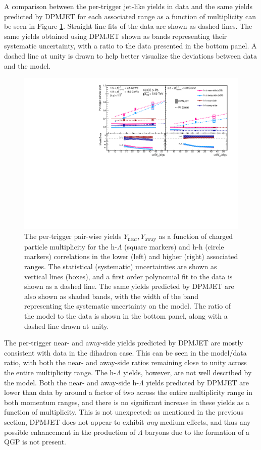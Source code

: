 A comparison between the per-trigger jet-like yields in data and the same yields predicted by DPMJET for each associated \pt range as a function of multiplicity can be seen in Figure \ref{fig:pairwise_yield_model}. Straight line fits of the data are shown as dashed lines. The same yields obtained using DPMJET shown as bands representing their systematic uncertainty, with a ratio to the data presented in the bottom panel. A dashed line at unity is drawn to help better visualize the deviations between data and the model.

\begin{figure}[h!]
\centering
\includegraphics[width=\textwidth]{figures/results/final_pairwise_plot_new_x_axis_model_ratio.pdf}
\caption{The per-trigger pair-wise yields $Y_{\text{near}}, Y_{\text{away}}$ as a function of charged particle multiplicity for the h-$\Lambda$ (square markers) and h-h (circle markers) correlations in the lower (left) and higher (right) associated \pt ranges. The statistical (systematic) uncertainties are shown as vertical lines (boxes), and a first order polynomial fit to the data is shown as a dashed line. The same yields predicted by DPMJET are also shown as shaded bands, with the width of the band representing the systematic uncertainty on the model. The ratio of the model to the data is shown in the bottom panel, along with a dashed line drawn at unity.}
\label{fig:pairwise_yield_model}
\end{figure}

The per-trigger near- and away-side yields predicted by DPMJET are mostly consistent with data in the dihadron case. This can be seen in the model/data ratio, with both the near- and away-side ratios remaining close to unity across the entire multiplicity range. The h-$\Lambda$ yields, however, are not well described by the model. Both the near- and away-side h-$\Lambda$ yields predicted by DPMJET are lower than data by around a factor of two across the entire multiplicity range in both momentum ranges, and there is no significant increase in these yields as a function of multiplicity. This is not unexpected: as mentioned in the previous section, DPMJET does not appear to exhibit \textit{any} medium effects, and thus any possible enhancement in the production of $\Lambda$ baryons due to the formation of a QGP is not present.

